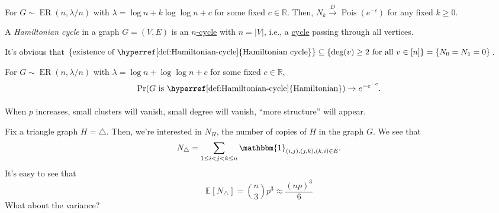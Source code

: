 \begin{theorem}
	For \(G \sim \operatorname{ER}(n, \lambda / n) \) with \(\lambda = \log n + k \log \log n + c\) for some fixed \(c \in \mathbb{R} \). Then, \(N_k \overset{D}{\to} \operatorname{Pois}(e^{-c}) \) for any fixed \(k \geq 0\).
\end{theorem}

\begin{definition}\label{def:Hamiltonian-cycle}
	A \emph{Hamiltonian cycle} in a graph \(G = (V, E)\) is an \hyperref[def:cycle]{\(n\)-cycle} with \(n = \lvert V \rvert \), i.e., a \hyperref[def:cycle]{cycle} passing through all vertices.
\end{definition}

It's obvious that \(\{ \text{existence of \hyperref[def:Hamiltonian-cycle]{Hamiltonian cycle}} \} \subseteq \{ \deg (v) \geq 2 \text{ for all } v \in [n] \} = \{ N_0 = N_1 = 0\} \).

\begin{theorem}
	For \(G \sim \operatorname{ER}(n, \lambda / n) \) with \(\lambda = \log n + \log \log n + c\) for some fixed \(c \in \mathbb{R} \),
	\[
		\Pr_{}(G\text{ is \hyperref[def:Hamiltonian-cycle]{Hamiltonian}} )
		\to e^{-e^{-c}}.
	\]
\end{theorem}

When \(p\) increases, small clusters will vanish, small degree will vanish, ``more structure'' will appear.

Fix a triangle graph \(H = \triangle\). Then, we're interested in \(N_H\), the number of copies of \(H\) in the graph \(G\). We see that
\[
	N_{\triangle}
	= \sum_{1 \leq i < j < k \leq n} \mathbbm{1}_{(i, j), (j, k), (k, i) \in E}.
\]
It's easy to see that
\[
	\mathbb{E}_{}[N_{\triangle}]
	= \binom{n}{3} p^3
	\approx \frac{(np)^3}{6}
\]
What about the variance?

